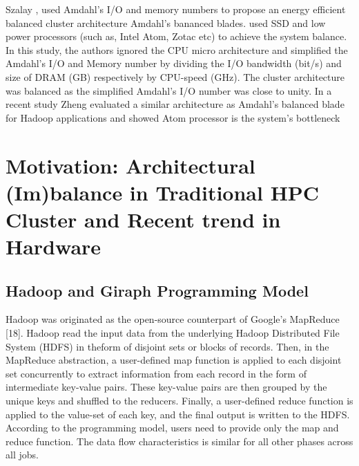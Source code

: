 \documentclass[journal]{IEEEtran}
\begin{document}
Szalay \cite{cluster:AmdahlBalancedBlade}, used Amdahl's I/O and memory numbers to propose an energy efficient balanced cluster architecture Amdahl’s bananced blades. \cite{cluster:AmdahlBalancedBlade} used SSD and low power processors (such as, Intel Atom, Zotac etc) to achieve the system balance. In this study, the authors ignored the CPU micro architecture and simplified the Amdahl's I/O and Memory number by dividing the I/O bandwidth (bit/s) and size of DRAM (GB) respectively by CPU-speed (GHz). The cluster architecture was balanced as the simplified Amdahl's I/O number was close to unity. In a recent study \cite{Balance:zheng2014hadoop} Zheng evaluated a similar architecture as Amdahl's balanced blade for Hadoop applications and showed Atom processor is the system's bottleneck  %

\section{Motivation: Architectural (Im)balance in Traditional HPC Cluster and Recent trend in Hardware}
\subsection{Hadoop and Giraph Programming Model}
Hadoop was originated as the open-source counterpart of Google’s MapReduce [18]. Hadoop read the input data from the underlying Hadoop Distributed File System (HDFS) in theform of disjoint sets or blocks of records. Then, in the MapReduce abstraction, a user-defined map function is applied to each disjoint set concurrently to extract information from each record in the form of intermediate key-value pairs. These key-value pairs are then grouped by the unique keys and shuffled to the reducers. Finally, a user-defined reduce function is applied to the value-set of each key, and the final output is written to the HDFS. According to the programming model, users need to provide only the map and reduce function. The data flow characteristics is similar for all other phases across all jobs.
 
\end{document}
